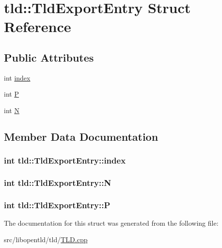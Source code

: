 \hypertarget{structtld_1_1TldExportEntry}{\section{tld\-:\-:Tld\-Export\-Entry Struct Reference}
\label{structtld_1_1TldExportEntry}
}
\subsection*{Public Attributes}
\begin{DoxyCompactItemize}
\item 
int \hyperlink{structtld_1_1TldExportEntry_a8b67c3367255beab5b728d8803c7cb78}{index}
\item 
int \hyperlink{structtld_1_1TldExportEntry_aa7f1939c611aeff5ef09cebad2fdea79}{P}
\item 
int \hyperlink{structtld_1_1TldExportEntry_a22f1125d40eecedb725e0f15aa07b01e}{N}
\end{DoxyCompactItemize}


\subsection{Member Data Documentation}
\hypertarget{structtld_1_1TldExportEntry_a8b67c3367255beab5b728d8803c7cb78}{
\subsubsection[{index}]{\setlength{\rightskip}{0pt plus 5cm}int tld\-::\-Tld\-Export\-Entry\-::index}}\label{structtld_1_1TldExportEntry_a8b67c3367255beab5b728d8803c7cb78}
\hypertarget{structtld_1_1TldExportEntry_a22f1125d40eecedb725e0f15aa07b01e}{
\subsubsection[{N}]{\setlength{\rightskip}{0pt plus 5cm}int tld\-::\-Tld\-Export\-Entry\-::\-N}}\label{structtld_1_1TldExportEntry_a22f1125d40eecedb725e0f15aa07b01e}
\hypertarget{structtld_1_1TldExportEntry_aa7f1939c611aeff5ef09cebad2fdea79}{
\subsubsection[{P}]{\setlength{\rightskip}{0pt plus 5cm}int tld\-::\-Tld\-Export\-Entry\-::\-P}}\label{structtld_1_1TldExportEntry_aa7f1939c611aeff5ef09cebad2fdea79}


The documentation for this struct was generated from the following file\-:\begin{DoxyCompactItemize}
\item 
src/libopentld/tld/\hyperlink{TLD_8cpp}{T\-L\-D.\-cpp}\end{DoxyCompactItemize}
